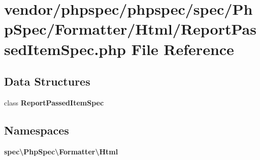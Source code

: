 \section{vendor/phpspec/phpspec/spec/\+Php\+Spec/\+Formatter/\+Html/\+Report\+Passed\+Item\+Spec.php File Reference}
\label{_report_passed_item_spec_8php}
\subsection*{Data Structures}
\begin{DoxyCompactItemize}
\item 
class {\bf Report\+Passed\+Item\+Spec}
\end{DoxyCompactItemize}
\subsection*{Namespaces}
\begin{DoxyCompactItemize}
\item 
 {\bf spec\textbackslash{}\+Php\+Spec\textbackslash{}\+Formatter\textbackslash{}\+Html}
\end{DoxyCompactItemize}
